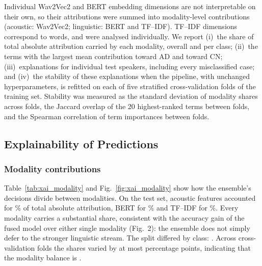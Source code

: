 Individual Wav2Vec2 and BERT embedding dimensions are not interpretable on their own, so their attributions were summed into modality-level contributions (acoustic: Wav2Vec2; linguistic: BERT and TF--IDF). TF--IDF dimensions correspond to words, and were analysed individually. We report (i)~the share of total absolute attribution carried by each modality, overall and per class; (ii)~the terms with the largest mean contribution toward AD and toward CN; (iii)~explanations for individual test speakers, including every misclassified case; and (iv)~the stability of these explanations when the pipeline, with unchanged hyperparameters, is refitted on each of five stratified cross-validation folds of the training set. Stability was measured as the standard deviation of modality shares across folds, the Jaccard overlap of the 20 highest-ranked terms between folds, and the Spearman correlation of term importances between folds.


\subsection{Explainability of Predictions}

\subsubsection{Modality contributions}
Table~\ref{tab:xai_modality} and Fig.~\ref{fig:xai_modality} show how the ensemble's decisions divide between modalities. On the test set, acoustic features accounted for \% of total absolute attribution, BERT for \% and TF--IDF for \%.
Every modality carries a substantial share, consistent with the accuracy gain of the fused model over either single modality (Fig.~2): the ensemble does not simply defer to the stronger linguistic stream.
The split differed by class: . Across cross-validation folds the shares varied by at most  percentage points, indicating that the modality balance is .

